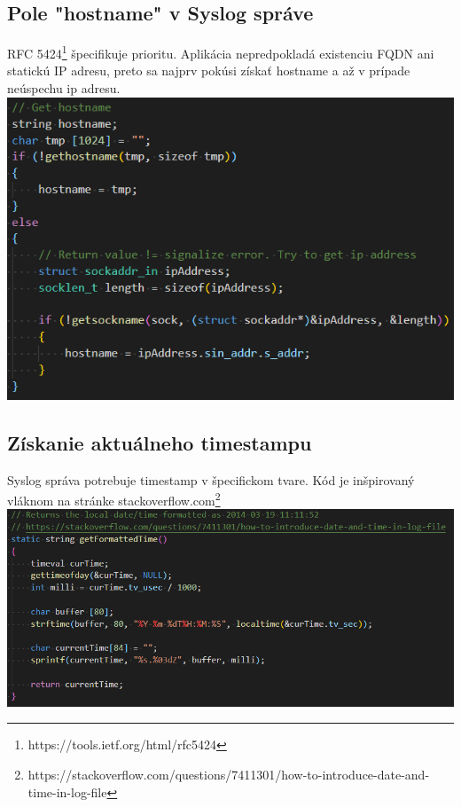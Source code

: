 \documentclass{article}
\begin{document}
        \subsection{Pole "hostname" v Syslog správe}
        RFC 5424\footnote{https://tools.ietf.org/html/rfc5424} špecifikuje prioritu. Aplikácia nepredpokladá existenciu FQDN ani statickú IP adresu, preto
        sa najprv pokúsi získať hostname a až v prípade neúspechu ip adresu.
        \includegraphics {hostname.png}

        \subsection{Získanie aktuálneho timestampu}
        Syslog správa potrebuje timestamp v špecifickom tvare. Kód je inšpirovaný vláknom na stránke stackoverflow.com\footnote{https://stackoverflow.com/questions/7411301/how-to-introduce-date-and-time-in-log-file}
        \includegraphics {timestamp.png}
\end{document}
